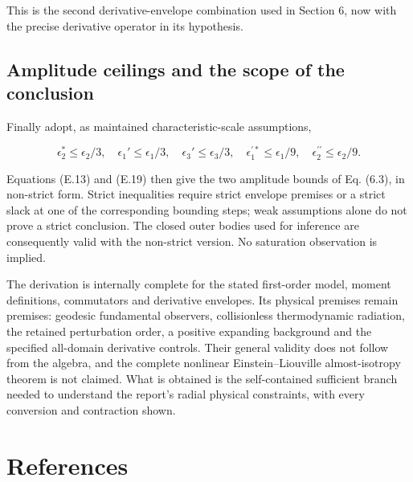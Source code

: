 \documentclass[
  11pt,
  a4paper]{article}
\begin{document}
This is the second derivative-envelope combination used in Section 6, now with the precise derivative operator in its hypothesis.

\hypertarget{e.7-amplitude-ceilings-and-the-scope-of-the-conclusion}{%
\subsection{Amplitude ceilings and the scope of the conclusion}\label{e.7-amplitude-ceilings-and-the-scope-of-the-conclusion}}

Finally adopt, as maintained characteristic-scale assumptions,

\[
\epsilon_2^*\le\epsilon_2/3,\quad
\epsilon_1'\le\epsilon_1/3,\quad
\epsilon_3'\le\epsilon_3/3,\quad
\epsilon_1^{\prime *}\le\epsilon_1/9,\quad
\epsilon_2^{\prime\prime}\le\epsilon_2/9.
\tag{E.20}
\]

Equations (E.13) and (E.19) then give the two amplitude bounds of Eq. (6.3), in non-strict form. Strict inequalities require strict envelope premises or a strict slack at one of the corresponding bounding steps; weak assumptions alone do not prove a strict conclusion. The closed outer bodies used for inference are consequently valid with the non-strict version. No saturation observation is implied.

The derivation is internally complete for the stated first-order model, moment definitions, commutators and derivative envelopes. Its physical premises remain premises: geodesic fundamental observers, collisionless thermodynamic radiation, the retained perturbation order, a positive expanding background and the specified all-domain derivative controls. Their general validity does not follow from the algebra, and the complete nonlinear Einstein--Liouville almost-isotropy theorem is not claimed. What is obtained is the self-contained sufficient branch needed to understand the report's radial physical constraints, with every conversion and contraction shown.

\clearpage
{}

\hypertarget{references}{%
\section*{References}\label{references}}
\end{document}
